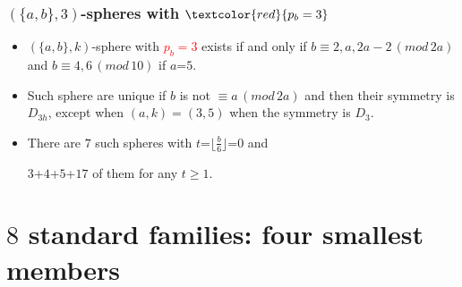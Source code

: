 \documentclass{beamer}
\begin{document}
\begin{frame}\frametitle{$(\{a,b\},3)$-spheres with
$\textcolor{red}{p_b=3}$}
\begin{itemize}

\item   $(\{a,b\},k)$-sphere with \textcolor{red}{$p_b=3$} exists
if and only if
$b\equiv 2,a,2a-2\,(mod\,2a)$ and  $b\equiv 4,6\,(mod\,10)$
if $a$=$5$.
\item  Such sphere are unique if $b$ is not
$\equiv a\,(mod\,2a)$ and then their symmetry is $D_{3h}$, except when
$(a,k)=(3,5)$ when the symmetry is $D_3$.
 

\item There are $7$ such spheres with $t$=$\lfloor{\frac{b}{6}}\rfloor$=$0$
and 

$3$+$4$+$5$+$17$ of them for any $t\ge 1$.
\end{itemize}
\end{frame}     





\section[]{$8$ standard families: four  smallest members}

\frame{
\begin{center}
\begin{tabular*}{7cm}{c}
\\[-0.5cm]
{\Huge \textcolor{blue}{IV. }\textcolor{red}{
$8$ standard families:}}
\\[4mm]{\Huge \textcolor{red}{
$4$ smallest members}
}
\end{tabular*}
\end{center}
}
\end{document}
